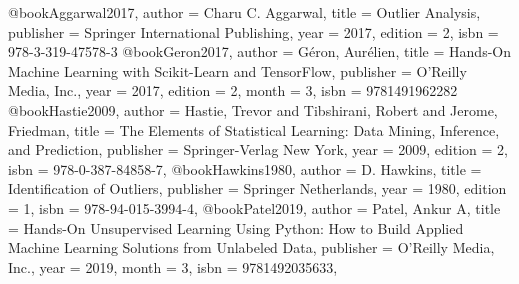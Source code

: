@book{Aggarwal2017,
  author    = {Charu C. Aggarwal}, 
  title     = {Outlier Analysis},
  publisher = {Springer International Publishing},
  year      = 2017,
  edition   = 2,
  isbn      = {978-3-319-47578-3}
}
@book{Geron2017,
  author    = {G{\'{e}}ron, Aur{\'{e}}lien}, 
  title     = {Hands-On Machine Learning with Scikit-Learn and TensorFlow},
  publisher = {O’Reilly Media, Inc.},
  year      = 2017,
  edition   = 2,
  month     = 3,
  isbn      = {9781491962282}
}
@book{Hastie2009,
  author = {Hastie, Trevor and Tibshirani, Robert and Jerome, Friedman},
  title = {The Elements of Statistical Learning: Data Mining, Inference, and Prediction},
  publisher = {Springer-Verlag New York},
  year = 2009,
  edition = 2,
  isbn = {978-0-387-84858-7},
}
@book{Hawkins1980,
  author = {D. Hawkins},
  title = {Identification of Outliers},
  publisher = {Springer Netherlands},
  year = 1980,
  edition = 1,
  isbn = {978-94-015-3994-4},
}
@book{Patel2019,
  author = {Patel, Ankur A},
  title = {Hands-On Unsupervised Learning Using Python: How to Build Applied Machine Learning Solutions from Unlabeled Data},
  publisher = {O'Reilly Media, Inc.},
  year = {2019},
  month     = 3,
  isbn = {9781492035633},
}
